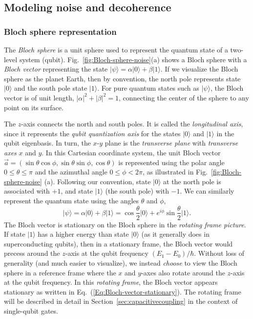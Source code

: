 \documentclass[aip,apr,twocolumn,showpacs,superscriptaddress,groupedaddress,nofootinbib,reprint]{revtex4-1}  %
\begin{document}
\subsection{\label{sec:modeling-noise}Modeling noise and decoherence}

\subsubsection{Bloch sphere representation}

The \textit{Bloch sphere} is a unit sphere used to represent the quantum state of a two-level system (qubit). Fig.~\ref{fig:Bloch-sphere-noise}(a) shows a Bloch sphere with a \textit{Bloch vector} representing the state $\lvert \psi\rangle = \alpha \lvert 0\rangle + \beta \lvert 1\rangle$. If we visualize the Bloch sphere as the planet Earth, then by convention, the north pole represents state $\lvert 0 \rangle$ and the south pole state $\lvert 1 \rangle$. For pure quantum states such as $\lvert \psi \rangle$, the Bloch vector is of unit length, $\lvert \alpha \rvert^2+\lvert \beta \rvert^2=1$, connecting the center of the sphere to any point on its surface.

The $z$-axis connects the north and south poles. It is called the \textit{longitudinal axis}, since it represents the \textit{qubit quantization axis} for the states $\lvert 0 \rangle$ and $\lvert 1 \rangle$ in the qubit eigenbasis. In turn, the $x$-$y$ plane is the \textit{transverse plane} with \textit{transverse axes} $x$ and $y$. In this Cartesian coordinate system, the unit Bloch vector $\vec{a}=(\sin \theta \cos \phi, \sin \theta \sin \phi, \cos \theta)$ is represented using the polar angle $0\leq \theta \leq \pi$ and the azimuthal angle $0 \leq \phi < 2\pi$, as illustrated in Fig.~\ref{fig:Bloch-sphere-noise} (a). Following our convention, state $\lvert 0 \rangle$ at the north pole is associated with $+1$, and state $\lvert 1 \rangle$ (the south pole) with $-1$. We can similarly represent the quantum state using the angles $\theta$ and $\phi$,
%
\begin{equation}
    \lvert \psi \rangle = \alpha \lvert 0 \rangle + \beta \lvert 1 \rangle = \cos\frac{\theta}{2} \lvert 0 \rangle + e^{i \phi}\sin \frac{\theta}{2} \lvert 1 \rangle.
    \label{Eq:Bloch-vector-stationary}
\end{equation}
%
The Bloch vector is stationary on the Bloch sphere in the \textit{rotating frame picture}. If state $\lvert 1 \rangle$ has a higher energy than state $\lvert 0 \rangle$ (as it generally does in superconducting qubits), then in a stationary frame, the Bloch vector would precess around the $z$-axis at the qubit frequency $(E_1-E_0)/\hbar$. Without loss of generality (and much easier to visualize), we instead \textit{choose} to view the Bloch sphere in a reference frame where the $x$ and $y$-axes also rotate around the $z$-axis at the qubit frequency. In this \textit{rotating frame}, the Bloch vector appears stationary as written in Eq.~(\ref{Eq:Bloch-vector-stationary}). The rotating frame will be described in detail in Section~\ref{sec:capacitivecoupling} in the context of single-qubit gates.
\end{document}
